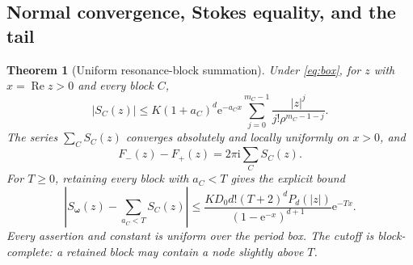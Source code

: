 \documentclass[11pt,a4paper]{article}
\numberwithin{equation}{section}
\newtheorem{theorem}{Theorem}[section]
\theoremstyle{definition}
\theoremstyle{remark}
\newcommand{\ii}{\mathrm i}
\newcommand{\e}{\mathrm e}
\newcommand{\re}{\operatorname{Re}}
\newcommand{\bw}{\boldsymbol\omega}
\begin{document}
\subsection{Normal convergence, Stokes equality, and the tail}
\begin{theorem}[Uniform resonance-block summation]
\label{thm:block}
Under \eqref{eq:box}, for $z$ with $x=\re z>0$ and every block $C$,
\begin{equation}
 |S_C(z)|\le K(1+a_C)^d\e^{-a_Cx}
     \sum_{j=0}^{m_C-1}\frac{|z|^j}{j!\rho^{m_C-1-j}}.
 \label{eq:block-bound}
\end{equation}
The series $\sum_C S_C(z)$ converges absolutely and locally uniformly on
$x>0$, and
\begin{equation}
 F_-(z)-F_+(z)=2\pi\ii\sum_C S_C(z).
 \label{eq:Stokes-block}
\end{equation}
For $T\ge0$, retaining every block with $a_C<T$ gives the explicit bound
\begin{equation}
 \left|S_{\bw}(z)-\sum_{a_C<T}S_C(z)\right|
 \le
 \frac{KD_0d!(T+2)^dP_d(|z|)}{(1-\e^{-x})^{d+1}}\e^{-Tx}.
 \label{eq:tail}
\end{equation}
Every assertion and constant is uniform over the period box. The cutoff
is block-complete: a retained block may contain a node slightly above $T$.
\end{theorem}
\end{document}

